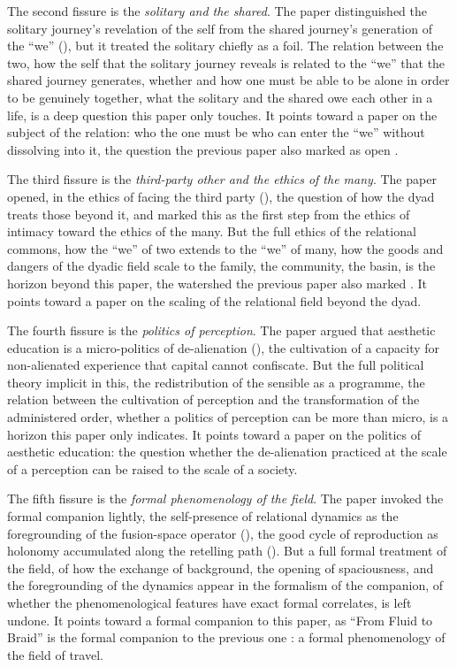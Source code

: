 The second fissure is the \emph{solitary and the shared}. The paper distinguished the solitary journey's revelation of the self from the shared journey's generation of the ``we'' (), but it treated the solitary chiefly as a foil. The relation between the two, how the self that the solitary journey reveals is related to the ``we'' that the shared journey generates, whether and how one must be able to be alone in order to be genuinely together, what the solitary and the shared owe each other in a life, is a deep question this paper only touches. It points toward a paper on the subject of the relation: who the one must be who can enter the ``we'' without dissolving into it, the question the previous paper also marked as open \parencite{paperxx}.

The third fissure is the \emph{third-party other and the ethics of the many}. The paper opened, in the ethics of facing the third party (), the question of how the dyad treats those beyond it, and marked this as the first step from the ethics of intimacy toward the ethics of the many. But the full ethics of the relational commons, how the ``we'' of two extends to the ``we'' of many, how the goods and dangers of the dyadic field scale to the family, the community, the basin, is the horizon beyond this paper, the watershed the previous paper also marked \parencite{paperxx,paperxv}. It points toward a paper on the scaling of the relational field beyond the dyad.

The fourth fissure is the \emph{politics of perception}. The paper argued that aesthetic education is a micro-politics of de-alienation (), the cultivation of a capacity for non-alienated experience that capital cannot confiscate. But the full political theory implicit in this, the redistribution of the sensible as a programme, the relation between the cultivation of perception and the transformation of the administered order, whether a politics of perception can be more than micro, is a horizon this paper only indicates. It points toward a paper on the politics of aesthetic education: the question whether the de-alienation practiced at the scale of a perception can be raised to the scale of a society.

The fifth fissure is the \emph{formal phenomenology of the field}. The paper invoked the formal companion lightly, the self-presence of relational dynamics as the foregrounding of the fusion-space operator (), the good cycle of reproduction as holonomy accumulated along the retelling path (). But a full formal treatment of the field, of how the exchange of background, the opening of spaciousness, and the foregrounding of the dynamics appear in the formalism of the companion, of whether the phenomenological features have exact formal correlates, is left undone. It points toward a formal companion to this paper, as ``From Fluid to Braid'' is the formal companion to the previous one \parencite{wan2026braid}: a formal phenomenology of the field of travel.

